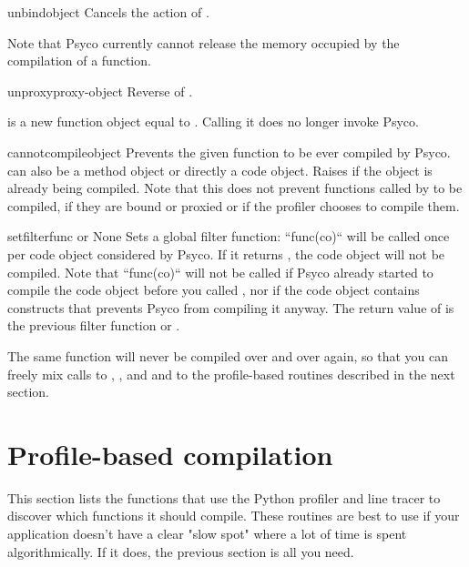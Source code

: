 \documentclass{manual}
\begin{document}
\begin{funcdesc}{unbind}{object}
  Cancels the action of .

  Note that Psyco currently cannot release the memory occupied by the compilation of a function.
\end{funcdesc}

\begin{funcdesc}{unproxy}{proxy-object}
  Reverse of .

   is a new function object equal to .  Calling it does no longer invoke Psyco.
\end{funcdesc}

\begin{funcdesc}{cannotcompile}{object}
  Prevents the given function to be ever compiled by Psyco.   can also be a method object or directly a code object.  Raises  if the object is already being compiled.  Note that this does not prevent functions called by  to be compiled, if they are bound or proxied or if the profiler chooses to compile them.
\end{funcdesc}

\begin{funcdesc}{setfilter}{func or None}
  Sets a global filter function: ``func(co)`` will be called once per code object  considered by Psyco.  If it returns , the code object will not be compiled.  Note that ``func(co)`` will not be called if Psyco already started to compile the code object before you called , nor if the code object contains constructs that prevents Psyco from compiling it anyway.  The return value of  is the previous filter function or .
\end{funcdesc}

The same function will never be compiled over and over again, so that you can freely mix calls to , ,  and  and to the profile-based routines described in the next section.


\section{Profile-based compilation}

This section lists the functions that use the Python profiler and line tracer to discover which functions it should compile.  These routines are best to use if your application doesn't have a clear "slow spot" where a lot of time is spent algorithmically.  If it does, the previous section is all you need.
\end{document}

